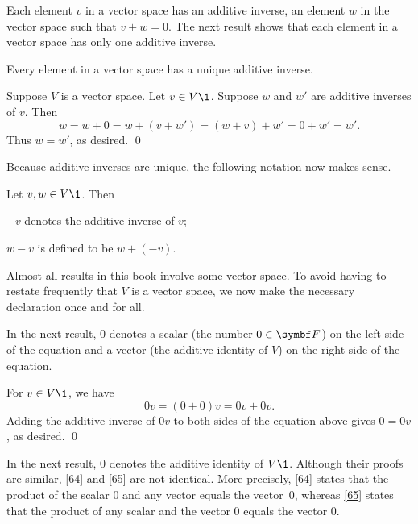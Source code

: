 Each element $v$ in a vector space  has an additive inverse, an element
$w$ in the vector space such that $v + w = 0$.  The next result shows that
each element in a vector space has only one  additive inverse.

{Every element in a vector space has a unique additive inverse.}

\proof
Suppose $V$ is a vector space. Let $v \in V\1$.  Suppose $w$ and $w'$ are
additive  inverses of $v$.  Then
\[
w = w + 0 = w + (v + w') = (w + v) + w' = 0 + w' = w'\!.
\]
Thus $w = w'\!$, as desired.
\qed

Because additive inverses are unique, the following notation now makes sense.

{
Let $v, w \in V\1$. Then
\begin{Itemize}
\item
$-v$ denotes the additive inverse of $v$;
\item
$w - v$ is defined to be $w + (-v)$.
\end{Itemize}}

Almost all results in this book involve some vector space.  To avoid having to restate frequently that $V$ is a vector space, we now make the necessary declaration once and for all.


In the next result, $0$ denotes a scalar (the number $0 \in \F{}$) on the left side of the equation and a vector (the additive identity of $V$) on the right side of the equation.



\proof
For $v \in V\1$, we have
\[
0v = (0 + 0)v = 0v + 0v.
\]
Adding the additive inverse of $0v$ to both sides of the equation above gives
$0 = 0v$, as desired.
\qed

In the next result, $0$ denotes the additive identity of $V\1$.  Although  their proofs are similar, \ref{64} and \ref{65} are not identical.  More precisely, \ref{64} states that the product of the scalar $0$ and  any vector equals the vector~$0$, whereas \ref{65} states that the  product of any scalar and the vector $0$ equals the vector $0$.

